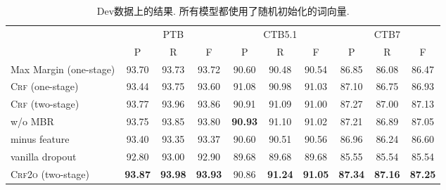 \begin{table*}[tb!]
    \centering
    \begin{tabularx}{\textwidth}{lccccccccc}
        \toprule
                                   & \multicolumn{3}{c}{PTB} & \multicolumn{3}{c}{CTB5.1} & \multicolumn{3}{c}{CTB7}                                                                                                       \\
                                   & P                       & R                          & F                        & P              & R              & F              & P              & R              & F              \\
        \midrule
        Max Margin (one-stage)     & 93.70                   & 93.73                      & 93.72                    & 90.60          & 90.48          & 90.54          & 86.85          & 86.08          & 86.47          \\
        \textsc{Crf} (one-stage)   & 93.44                   & 93.75                      & 93.60                    & 91.08          & 90.98          & 91.03          & 87.10          & 86.75          & 86.93          \\[3pt]
        \textsc{Crf} (two-stage)   & 93.77                   & 93.96                      & 93.86                    & 90.91          & 91.09          & 91.00          & 87.27          & 87.00          & 87.13          \\
        \qquad w/o MBR             & 93.75                   & 93.85                      & 93.80                    & \textbf{90.93} & 91.10          & 91.02          & 87.21          & 86.89          & 87.05          \\
        \qquad minus feature       & 93.40                   & 93.35                      & 93.37                    & 90.60          & 90.51          & 90.56          & 86.96          & 86.24          & 86.60          \\
        \qquad vanilla dropout     & 92.80                   & 93.00                      & 92.90                    & 89.68          & 89.68          & 89.68          & 85.55          & 85.54          & 85.54          \\
        \textsc{Crf2o} (two-stage) & \textbf{93.87}          & \textbf{93.98}             & \textbf{93.93}           & 90.86          & \textbf{91.24} & \textbf{91.05} & \textbf{87.34} & \textbf{87.16} & \textbf{87.25} \\

        \bottomrule
    \end{tabularx}
    \caption{Dev数据上的结果. 所有模型都使用了随机初始化的词向量.}
    \label{table:con-dev}
\end{table*}
